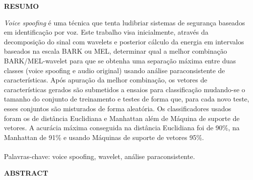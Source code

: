 \setlength{\parindent}{0pt}
\newpage \thispagestyle{empty}
\vspace{1.5cm}
\fontsize{12}{\baselineskip} \selectfont

\begin{center}
	{\huge{\textbf{RESUMO}}}
\end{center}

\begin{myenv}{1.5}
	\fontsize{12}{\baselineskip} \selectfont \onehalfspacing
	\par \null
	\par \null
	\par \textit{Voice spoofing} é uma técnica que tenta ludibriar sistemas de segurança baseados em identificação por voz. Este trabalho visa inicialmente, através da decomposição do sinal com wavelets e posterior cálculo da energia em intervalos baseados na escala BARK ou MEL, determinar qual a melhor combinação BARK/MEL-wavelet para que se obtenha uma separação máxima entre duas classes (voice spoofing e audio original) usando análise paraconsistente de características. Após apuração da melhor combinação, os vetores de características gerados são submetidos a ensaios para classificação mudando-se o tamanho do conjunto de treinamento e testes de forma que, para cada novo teste, esses conjuntos são misturados de forma aleatória. Os classificadores usados foram os de distância Euclidiana e Manhattan além de Máquina de suporte de vetores. A acurácia máxima conseguida na distância Euclidiana foi de 90\%, na Manhattan de 91\% e usando Máquinas de suporte de vetores 95\%.\\\\
	Palavras-chave: voice spoofing, wavelet, análise paraconsistente.
\end{myenv}

\setlength{\parindent}{0pt}
\newpage \thispagestyle{empty}
\vspace{1.5cm}
\fontsize{12}{\baselineskip} \selectfont
\begin{center}
	{\huge{\textbf{ABSTRACT}}}
\end{center}

